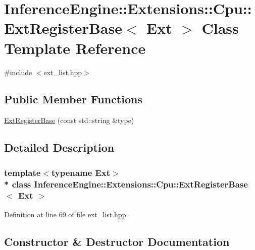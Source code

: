 \hypertarget{classInferenceEngine_1_1Extensions_1_1Cpu_1_1ExtRegisterBase}{}\section{Inference\+Engine\+:\+:Extensions\+:\+:Cpu\+:\+:Ext\+Register\+Base$<$ Ext $>$ Class Template Reference}
\label{classInferenceEngine_1_1Extensions_1_1Cpu_1_1ExtRegisterBase}


{\ttfamily \#include $<$ext\+\_\+list.\+hpp$>$}

\subsection*{Public Member Functions}
\begin{DoxyCompactItemize}
\item 
\hyperlink{classInferenceEngine_1_1Extensions_1_1Cpu_1_1ExtRegisterBase_a1d56b4f9730d0e019c31539654c666ee}{Ext\+Register\+Base} (const std\+::string \&type)
\end{DoxyCompactItemize}


\subsection{Detailed Description}
\subsubsection*{template$<$typename Ext$>$\\*
class Inference\+Engine\+::\+Extensions\+::\+Cpu\+::\+Ext\+Register\+Base$<$ Ext $>$}



Definition at line 69 of file ext\+\_\+list.\+hpp.



\subsection{Constructor \& Destructor Documentation}
